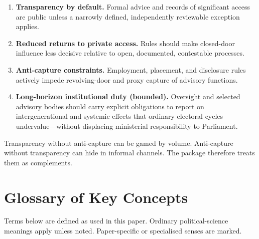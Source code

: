 \documentclass[11pt,a4paper]{article}
\begin{document}
\begin{enumerate}[leftmargin=*]
    \item \textbf{Transparency by default.} Formal advice and records of significant access are public unless a narrowly defined, independently reviewable exception applies.
    \item \textbf{Reduced returns to private access.} Rules should make closed-door influence less decisive relative to open, documented, contestable processes.
    \item \textbf{Anti-capture constraints.} Employment, placement, and disclosure rules actively impede revolving-door and proxy capture of advisory functions.
    \item \textbf{Long-horizon institutional duty (bounded).} Oversight and selected advisory bodies should carry explicit obligations to report on intergenerational and systemic effects that ordinary electoral cycles undervalue---without displacing ministerial responsibility to Parliament.
\end{enumerate}

Transparency without anti-capture can be gamed by volume. Anti-capture without transparency can hide in informal channels. The package therefore treats them as complements.

\section{Glossary of Key Concepts}

\noindent
Terms below are defined as used in this paper. Ordinary political-science meanings apply unless noted. Paper-specific or specialised senses are marked.
\end{document}
